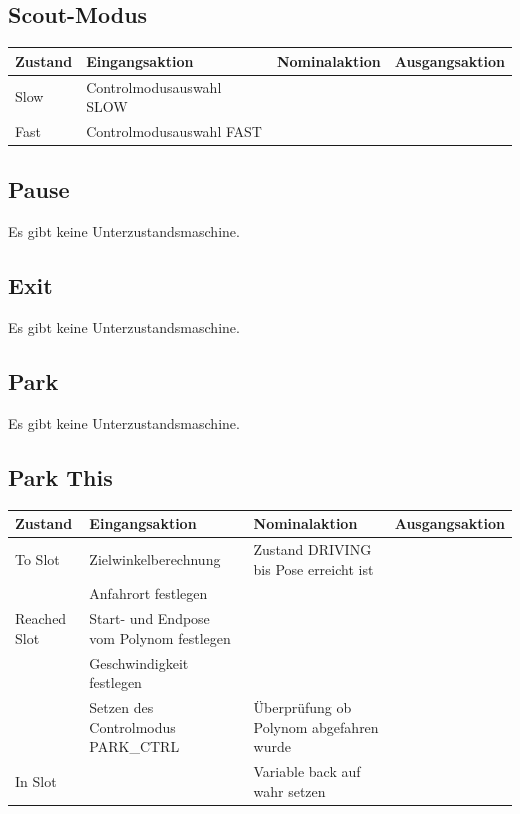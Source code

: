 \subsection{Scout-Modus}

\begin{tabular}{|p{1.5cm}|p{4cm}|p{4cm}|p{3cm}|}
	\hline 
	Zustand & Eingangsaktion & Nominalaktion & Ausgangsaktion \\ 
	\hline 
	Slow & Controlmodusauswahl \glqq SLOW\grqq  &  &  \\ 
	\hline 
	Fast & Controlmodusauswahl \glqq FAST\grqq  &  &  \\ 
	\hline 
\end{tabular} 

\subsection{Pause}

Es gibt keine Unterzustandsmaschine.

\subsection{Exit}

Es gibt keine Unterzustandsmaschine.

\subsection{Park}

Es gibt keine Unterzustandsmaschine.

\subsection{Park This}

\begin{tabular}{|p{1.5cm}|p{4cm}|p{4cm}|p{3cm}|}
	\hline 
	Zustand & Eingangsaktion & Nominalaktion & Ausgangsaktion \\ 
	\hline 
	To Slot & Zielwinkelberechnung & Zustand \glqq DRIVING\grqq{} bis Pose erreicht ist &  \\ 
	\hline 
	 & Anfahrort festlegen &  &  \\ 
	\hline
	Reached Slot & Start- und Endpose vom Polynom festlegen &  &  \\ 
	\hline
	 & Geschwindigkeit festlegen &  &  \\ 
	\hline 
	 & Setzen des Controlmodus \glqq PARK\_CTRL\grqq{}   & Überprüfung ob Polynom abgefahren wurde &  \\ 
	\hline
	In Slot &  & Variable \glqq back\grqq{}  auf wahr setzen &  \\ 
	\hline 
	
\end{tabular} 

